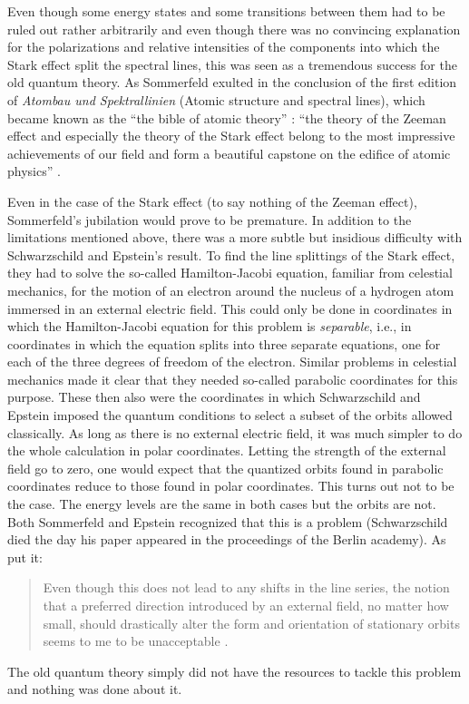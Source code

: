 Even though some energy states and some transitions between them had to be ruled out rather arbitrarily and even though there was no convincing explanation for the polarizations and relative intensities of the components into which the Stark effect split the spectral lines, this was seen as a tremendous success for the old quantum theory. As Sommerfeld exulted in the conclusion of the first edition of \emph{Atombau und Spektrallinien} (Atomic structure and spectral lines), which became known as the ``the bible of atomic theory'' \citep[pp. 255--256]{Eckert 2013}: ``the theory of the Zeeman effect and especially the theory of the Stark effect belong to the most impressive achievements of our field and form a beautiful capstone on the edifice of atomic physics'' \citep[pp.\ 457--458]{Sommerfeld 1919}.

Even in the case of the Stark effect (to say nothing of the Zeeman effect), Sommerfeld's jubilation would prove to be premature. In addition to the limitations mentioned above, there was a more subtle but insidious difficulty with Schwarzschild and Epstein's result. To find the line splittings of the Stark effect, they had to solve the so-called Hamilton-Jacobi equation, familiar from celestial mechanics, for the motion of an electron around the nucleus of a hydrogen atom immersed in an external electric field. This could only be done in coordinates in which the Hamilton-Jacobi equation for this problem is \emph{separable}, i.e., in coordinates in which the equation splits into three separate equations, one for each of the three degrees of freedom of the electron. Similar problems in celestial mechanics made it clear that they needed so-called parabolic coordinates for this purpose. These then also were the coordinates in which Schwarzschild and Epstein imposed the quantum conditions to select a subset of the orbits allowed classically. As long as there is no external electric field, it was much simpler to do the whole calculation in polar coordinates. Letting the strength of the external field go to zero, one would expect that  the quantized orbits found in parabolic coordinates reduce to those found in polar coordinates. This turns out not to be the case. The energy levels are the same in both cases but the orbits are not. Both Sommerfeld and Epstein recognized that this is a problem (Schwarzschild died the day his paper appeared in the proceedings of the Berlin academy). As \citet[p.\ 507]{Epstein 1916} put it:
\begin{quote}
Even though this does not lead to any shifts in the line series, the notion that a preferred direction introduced by an external field, no matter how small, should drastically alter the form and orientation of stationary orbits seems to me to be unacceptable \citep[quoted in][p.\ 251]{Duncan and Janssen 2015}.
\end{quote}    
The old quantum theory simply did not have the resources to tackle this problem and nothing was done about it.


